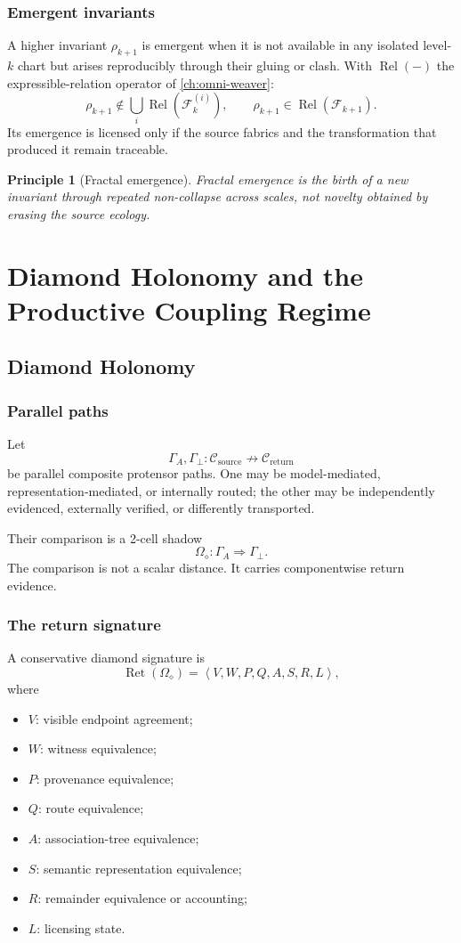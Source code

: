 \documentclass[12pt,openany]{book}
\newtheorem{principle}[definition]{Principle}
\theoremstyle{remark}
\DeclareMathOperator{\Ret}{Ret}
\DeclareMathOperator{\Rel}{Rel}
\newcommand{\Fabric}{\mathcal F}
\newcommand{\DiamondHol}{\Omega_{\diamond}}
\newcommand{\typedtuple}[1]{\left\langle #1 \right\rangle}
\begin{document}
\section{Emergent invariants}
A higher invariant $\rho_{k+1}$ is emergent when it is not available in any isolated level-$k$ chart but arises reproducibly through their gluing or clash. With $\Rel(-)$ the expressible-relation operator of \cref{ch:omni-weaver}:
\[
\rho_{k+1}
\notin
\bigcup_i\Rel(\Fabric_k^{(i)}),
\qquad
\rho_{k+1}
\in
\Rel(\Fabric_{k+1}).
\]
Its emergence is licensed only if the source fabrics and the transformation that produced it remain traceable.

\begin{principle}[Fractal emergence]
Fractal emergence is the birth of a new invariant through repeated non-collapse across scales, not novelty obtained by erasing the source ecology.
\end{principle}

\part{Diamond Holonomy and the Productive Coupling Regime}

\chapter{Diamond Holonomy}
\label{ch:diamond}

\section{Parallel paths}
Let
\[
\Gamma_A,\Gamma_\perp:
\mathcal C_{\mathrm{source}}
\nrightarrow
\mathcal C_{\mathrm{return}}
\]
be parallel composite protensor paths. One may be model-mediated, representation-mediated, or internally routed; the other may be independently evidenced, externally verified, or differently transported.

Their comparison is a 2-cell shadow
\[
\DiamondHol:\Gamma_A\Longrightarrow\Gamma_\perp.
\]
The comparison is not a scalar distance. It carries componentwise return evidence.

\section{The return signature}
A conservative diamond signature is
\[
\Ret(\DiamondHol)
=
\typedtuple{
V,W,P,Q,A,S,R,L
},
\]
where
\begin{itemize}
\item $V$: visible endpoint agreement;
\item $W$: witness equivalence;
\item $P$: provenance equivalence;
\item $Q$: route equivalence;
\item $A$: association-tree equivalence;
\item $S$: semantic representation equivalence;
\item $R$: remainder equivalence or accounting;
\item $L$: licensing state.
\end{itemize}
\end{document}
